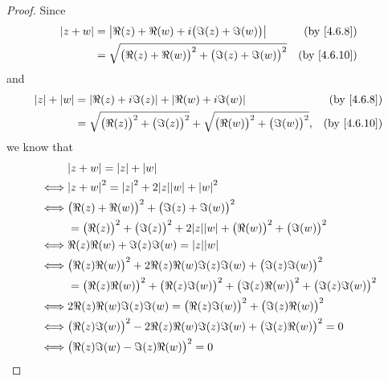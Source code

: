 \begin{proof}
  Since
  \begin{align*}
    \abs{z + w} & = \abs{\Re(z) + \Re(w) + i \big(\Im(z) + \Im(w)\big)}              & \text{(by \cref{4.6.8})}  \\
                & = \sqrt{\big(\Re(z) + \Re(w)\big)^2 + \big(\Im(z) + \Im(w)\big)^2} & \text{(by \cref{4.6.10})}
  \end{align*}
  and
  \begin{align*}
    \abs{z} + \abs{w} & = \abs{\Re(z) + i \Im(z)} + \abs{\Re(w) + i \Im(w)}                                                & \text{(by \cref{4.6.8})}  \\
                      & = \sqrt{\big(\Re(z)\big)^2 + \big(\Im(z)\big)^2} + \sqrt{\big(\Re(w)\big)^2 + \big(\Im(w)\big)^2}, & \text{(by \cref{4.6.10})}
  \end{align*}
  we know that
  \begin{align*}
         & \abs{z + w} = \abs{z} + \abs{w}                                                                                 \\
    \iff & \abs{z + w}^2 = \abs{z}^2 + 2 \abs{z} \abs{w} + \abs{w}^2                                                       \\
    \iff & \big(\Re(z) + \Re(w)\big)^2 + \big(\Im(z) + \Im(w)\big)^2                                                       \\
         & = \big(\Re(z)\big)^2 + \big(\Im(z)\big)^2 + 2 \abs{z} \abs{w} + \big(\Re(w)\big)^2 + \big(\Im(w)\big)^2         \\
    \iff & \Re(z) \Re(w) + \Im(z) \Im(w) = \abs{z} \abs{w}                                                                 \\
    \iff & \big(\Re(z) \Re(w)\big)^2 + 2 \Re(z) \Re(w) \Im(z) \Im(w) + \big(\Im(z) \Im(w)\big)^2                           \\
         & = \big(\Re(z) \Re(w)\big)^2 + \big(\Re(z) \Im(w)\big)^2 + \big(\Im(z) \Re(w)\big)^2 + \big(\Im(z) \Im(w)\big)^2 \\
    \iff & 2 \Re(z) \Re(w) \Im(z) \Im(w) = \big(\Re(z) \Im(w)\big)^2 + \big(\Im(z) \Re(w)\big)^2                           \\
    \iff & \big(\Re(z) \Im(w)\big)^2 - 2 \Re(z) \Re(w) \Im(z) \Im(w) + \big(\Im(z) \Re(w)\big)^2 = 0                       \\
    \iff & \big(\Re(z) \Im(w) - \Im(z) \Re(w)\big)^2 = 0                                                                   \\

\end{align*}
\end{proof}
